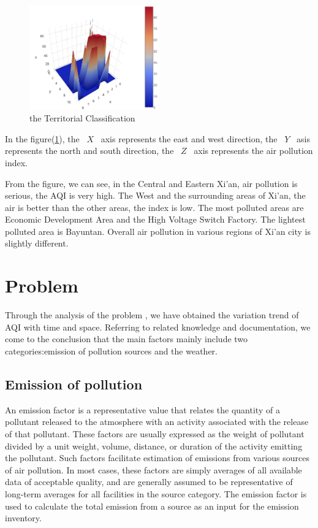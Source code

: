 \documentclass[a4paper,11pt]{article}
\begin{document}
\begin{figure}[h]%
\centering %
\includegraphics[width=0.50\textwidth]{./Pic/3d.jpg}
\caption{the Territorial Classification}
\label{fig:3d}       %
\end{figure}
\par In the figure(\ref{fig:3d}), the ~$X$~ axis represents the east and west direction, the ~$Y$~ asis represents the north and south direction, the ~$Z$~ axis represents the air pollution index.
\par From the figure, we can see, in the Central and Eastern Xi'an, air pollution is serious, the AQI is very high. The West and the surrounding areas of Xi'an, the air is better than the other areas, the index is low. The most polluted areas are Economic Development Area and the High Voltage Switch Factory. The lightest polluted area is Bayuntan. Overall air pollution in various regions of Xi'an city is slightly different.


\section{Problem \uppercase\expandafter{}}

\par Through the analysis of the problem  \uppercase\expandafter{}, we have obtained the variation trend of AQI with time and space. Referring to related knowledge and documentation, we come to the conclusion that the main factors mainly include two categories:emission of pollution sources and the weather.
\subsection{Emission of pollution}
\par An emission factor is a representative value that relates the quantity of a pollutant released to the atmosphere with an activity associated with the release of that pollutant. These factors are usually expressed as the weight of pollutant divided by a unit weight, volume, distance, or duration of the activity emitting the pollutant. Such factors facilitate estimation of emissions from various sources of air pollution. In most cases, these factors are simply averages of all available data of acceptable quality, and are generally assumed to be representative of long-term averages for all facilities in the source category. The emission factor is used to calculate the total emission from a source as an input for the emission inventory.
\end{document}
